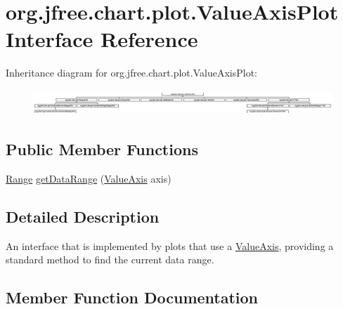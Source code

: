 \hypertarget{interfaceorg_1_1jfree_1_1chart_1_1plot_1_1_value_axis_plot}{}\section{org.\+jfree.\+chart.\+plot.\+Value\+Axis\+Plot Interface Reference}
\label{interfaceorg_1_1jfree_1_1chart_1_1plot_1_1_value_axis_plot}
Inheritance diagram for org.\+jfree.\+chart.\+plot.\+Value\+Axis\+Plot\+:\begin{figure}[H]
\begin{center}
\leavevmode
\includegraphics[height=0.958084cm]{interfaceorg_1_1jfree_1_1chart_1_1plot_1_1_value_axis_plot}
\end{center}
\end{figure}
\subsection*{Public Member Functions}
\begin{DoxyCompactItemize}
\item 
\mbox{\hyperlink{classorg_1_1jfree_1_1data_1_1_range}{Range}} \mbox{\hyperlink{interfaceorg_1_1jfree_1_1chart_1_1plot_1_1_value_axis_plot_a54815b2f078c11b2618804fe3e7e5353}{get\+Data\+Range}} (\mbox{\hyperlink{classorg_1_1jfree_1_1chart_1_1axis_1_1_value_axis}{Value\+Axis}} axis)
\end{DoxyCompactItemize}


\subsection{Detailed Description}
An interface that is implemented by plots that use a \mbox{\hyperlink{}{Value\+Axis}}, providing a standard method to find the current data range. 

\subsection{Member Function Documentation}
\mbox{\label{interfaceorg_1_1jfree_1_1chart_1_1plot_1_1_value_axis_plot_a54815b2f078c11b2618804fe3e7e5353}} 
